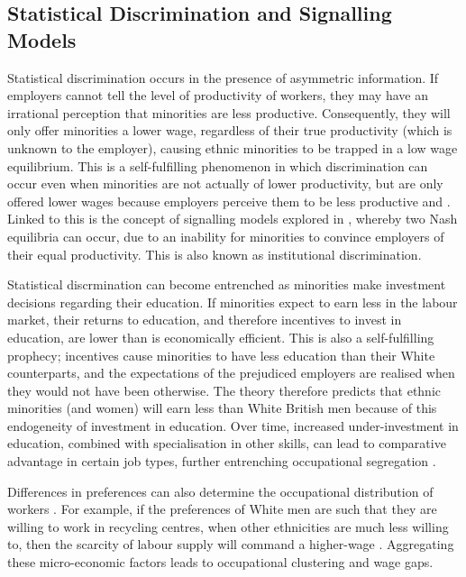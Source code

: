 \documentclass[class=article, crop=false]{standalone}
\begin{document}
\subsection{Statistical Discrimination and Signalling Models}
\label{sec:Stat_discrim and signalling}
Statistical discrimination occurs in the presence of asymmetric information. If employers cannot tell the level of productivity of workers, they may have an irrational perception that minorities are less productive. Consequently, they will only offer minorities a lower wage, regardless of their true productivity (which is unknown to the employer), causing ethnic minorities to be trapped in a low wage equilibrium. This is a self-fulfilling phenomenon in which discrimination can occur even when minorities are not actually of lower productivity, but are only offered lower wages because employers perceive them to be less productive \citep{Arrow} and \citep{LundbergB}. Linked to this is the concept of signalling models explored in \citet{Barr}, whereby two Nash equilibria can occur, due to an inability for minorities to convince employers of their equal productivity. This is also known as institutional discrimination.

Statistical discrmination can become entrenched as minorities make investment decisions regarding their education. If minorities expect to earn less in the labour market, their returns to education, and therefore incentives to invest in education, are lower than is economically efficient. This is also a self-fulfilling prophecy; incentives cause minorities to have less education than their White counterparts, and the expectations of the prejudiced employers are realised when they would not have been otherwise. The theory therefore predicts that ethnic minorities (and women) will earn less than White British men because of this endogeneity of investment in education. Over time, increased under-investment in education, combined with specialisation in other skills, can lead to comparative advantage in certain job types, further entrenching occupational segregation \citep{Altonji}.

Differences in preferences can also determine the occupational distribution of workers \citep{Thaler}. For example, if the preferences of White men are such that they are willing to work in recycling centres, when other ethnicities are much less willing to, then the scarcity of labour supply will command a higher-wage \citep{Altonji}. Aggregating these micro-economic factors leads to occupational clustering and wage gaps.
\end{document}
